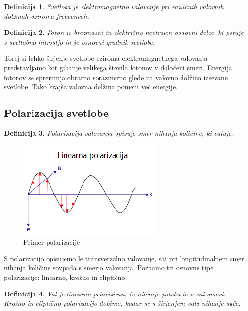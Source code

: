 \documentclass[A4paper, 11pt]{article}
\newtheorem{definicija}{Definicija}
\begin{document}
\begin{definicija}
Svetloba je elektromagnetno valovanje pri različnih valovnih dolžinah oziroma frekvencah.
\end{definicija}

\begin{definicija}
Foton je brezmasni in električno nevtralen osnovni delec, ki potuje s svetlobno hitrostjo in je osnovni gradnik svetlobe.
\end{definicija} 

Torej si lahko širjenje svetlobe oziroma elektromagnetnega valovanja predstavljamo kot gibanje velikega števila fotonov v določeni smeri. Energija fotonov se spreminja obratno sorazmerno glede na valovno dolžino izsevane svetlobe. Tako krajša valovna dolžina pomeni več energije.

\pagebreak

\subsection{Polarizacija svetlobe}

\begin{definicija}
Polarizacija valovanja opisuje smer nihanja količine, ki valuje.
\end{definicija}

\begin{figure}[h]
\centering
\caption{Primer polarizacije}
\includegraphics[scale=0.75]{1}
\end{figure}

S polarizacijo opisujemo le transverzalno valovanje, saj pri longitudinalnem smer nihanja količine sovpada s smerjo valovanja. Poznamo tri osnovne tipe polarizacije: linearno, krožno in eliptično.

\begin{definicija}
Val je linearno polariziran, če nihanje poteka le v eni smeri. Krožno in eliptično polarizacijo dobimo, kadar se s širjenjem vala nihanje suče.
\end{definicija}
\end{document}
